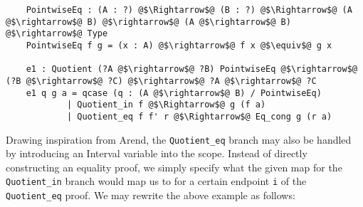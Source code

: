 \documentclass[12pt,twoside,maitrise]{dms}
\theoremstyle{definition}
\numberwithin{equation}{section}
\numberwithin{table}{chapter}
\numberwithin{figure}{chapter}
\newcommand\id[1] {\texttt{#1}}
\begin{document}


\begin{verbatim}
    PointwiseEq : (A : ?) @$\Rightarrow$@ (B : ?) @$\Rightarrow$@ (A @$\rightarrow$@ B) @$\rightarrow$@ (A @$\rightarrow$@ B) @$\rightarrow$@ Type
    PointwiseEq f g = (x : A) @$\rightarrow$@ f x @$\equiv$@ g x

    e1 : Quotient (?A @$\rightarrow$@ ?B) PointwiseEq @$\rightarrow$@ (?B @$\rightarrow$@ ?C) @$\rightarrow$@ ?A @$\rightarrow$@ ?C
    e1 q g a = qcase (q : (A @$\rightarrow$@ B) / PointwiseEq)
            | Quotient_in f @$\Rightarrow$@ g (f a)
            | Quotient_eq f f' r @$\Rightarrow$@ Eq_cong g (r a)
\end{verbatim}

Drawing inspiration from Arend, the \id{Quotient\_eq} branch may also be handled
by introducing an Interval variable into the scope. Instead of directly
constructing an equality proof, we simply specify what the given map for the
\id{Quotient\_in} branch would map us to for a certain endpoint \id{i} of the
\id{Quotient\_eq} proof. We may rewrite the above example as follows:

\end{document}

